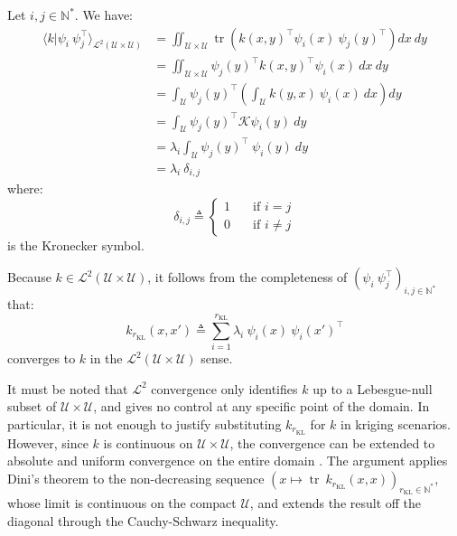 Let $i,j\in\mathbb{N}^*$. We have:
\begin{equation}
	\begin{aligned}
		\langle k|\psi_i\:\psi_j^\top\rangle_{\mathcal{L}^2(\mathcal{U}\times\mathcal{U})}&=\iint_{\mathcal{U}\times\mathcal{U}}{\operatorname{tr}\left(k(x,y)^\top\psi_i(x)\:\psi_j(y)^\top\right)dx\:dy}\\
		&=\iint_{\mathcal{U}\times\mathcal{U}}{\psi_j(y)^\top k(x,y)^\top\psi_i(x)\:dx\:dy}\\
		&=\int_{\mathcal{U}}{\psi_j(y)^\top\left(\int_{\mathcal{U}}{k(y,x)\:\psi_i(x)\:dx}\right)dy}\\
		&=\int_{\mathcal{U}}{\psi_j(y)^\top\mathcal{K}\psi_i(y)\:dy}\\
		&=\lambda_i\int_{\mathcal{U}}{\psi_j(y)^\top\:\psi_i(y)\:dy}\\
		&=\lambda_i\:\delta_{i,j}
	\end{aligned}
\end{equation}
where:
\begin{equation}
	\delta_{i,j}\triangleq\left\{\begin{aligned}
	1&\quad\text{if }i=j\\0&\quad\text{if }i\neq j
	\end{aligned}\right.
\end{equation}
is the Kronecker symbol.

Because $k\in\mathcal{L}^2(\mathcal{U}\times\mathcal{U})$, it follows from the completeness of $(\psi_i\:\psi_j^\top)_{i,j\in\mathbb{N}^*}$ that:
\begin{equation}
	k_{r_{\mathrm{KL}}}(x,x')\triangleq\sum_{i=1}^{r_{\mathrm{KL}}}\lambda_i\:\psi_i(x)\:\psi_i(x')^\top
\end{equation}
converges to $k$ in the $\mathcal{L}^2(\mathcal{U}\times\mathcal{U})$ sense.

It must be noted that $\mathcal{L}^2$ convergence only identifies $k$ up to a Lebesgue-null subset of $\mathcal{U}\times\mathcal{U}$, and gives no control at any specific point of the domain. In particular, it is not enough to justify substituting $k_{r_{\mathrm{KL}}}$ for $k$ in kriging scenarios. However, since $k$ is continuous on $\mathcal{U}\times\mathcal{U}$, the convergence can be extended to absolute and uniform convergence on the entire domain \cite{bib:Karhunen-Loeve}. The argument applies Dini's theorem \cite{bib:Dini} to the non-decreasing sequence $\left(x\mapsto\operatorname{tr}\:k_{r_{\mathrm{KL}}}(x,x)\right)_{r_{\mathrm{KL}}\in\mathbb{N}^*}$, whose limit is continuous on the compact $\mathcal{U}$, and extends the result off the diagonal through the Cauchy-Schwarz inequality.

